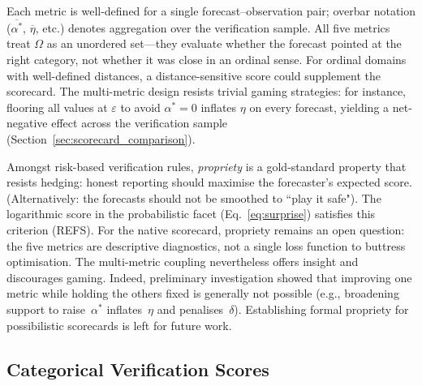 Each metric is well-defined for a single forecast--observation pair;
overbar notation ($\overline{\alpha^*}$, $\overline{\eta}$, etc.)
denotes aggregation over the verification sample.
All five metrics treat $\Omega$ as an unordered set---they evaluate
whether the forecast pointed at the right category, not whether it was
close in an ordinal sense. For ordinal domains with well-defined
distances, a distance-sensitive score could supplement the scorecard.
The multi-metric design resists trivial gaming strategies: for
instance, flooring all values at $\varepsilon$ to avoid $\alpha^* = 0$
inflates $\eta$ on every forecast, yielding a net-negative effect
across the verification sample
(Section~\ref{sec:scorecard_comparison}).

Amongst risk-based verification rules,
\textit{propriety} is a gold-standard property that
resists hedging: honest reporting should maximise
the forecaster's expected score.
(Alternatively: the forecasts should not be smoothed
to ``play it safe").
The logarithmic score in the probabilistic facet
(Eq.~\ref{eq:surprise}) satisfies this criterion
(REFS). For the native scorecard,
propriety remains an open question: the five metrics
are descriptive diagnostics, not a single loss
function to buttress optimisation. The multi-metric
coupling nevertheless offers insight and discourages
gaming. Indeed, preliminary investigation showed that
improving one metric while holding the others fixed
is generally not possible (e.g., broadening
support to raise~$\alpha^*$ inflates~$\eta$ and
penalises~$\delta$). Establishing formal propriety for
possibilistic scorecards is left for future work.

\subsection{Categorical Verification Scores}%
\label{sec:cat_scores}

